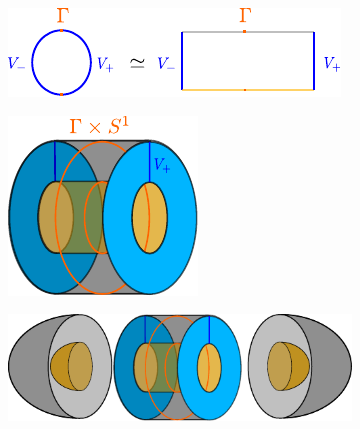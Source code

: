\begin{figure}[ht]
    \begin{subfigure}[t]{.54\linewidth}
        \includegraphics[trim=-.3cm -.5cm -.3cm -.5cm, width=\linewidth]{../images/convex_decomposition_of_s1.pdf}
    \end{subfigure}\hspace*{.1\linewidth}
    \begin{subfigure}[t]{.35\linewidth}
        \includegraphics[trim=-.5cm -.5cm -.5cm -.5cm, width=\linewidth]{../images/v_times_s1.pdf}
    \end{subfigure}
    \begin{subfigure}{.9\linewidth}
        \includegraphics[trim=-.5cm -.5cm -.5cm -.5cm, width=\linewidth]{../images/v_times_s1_with_caps.pdf}

\end{subfigure}
\end{figure}
